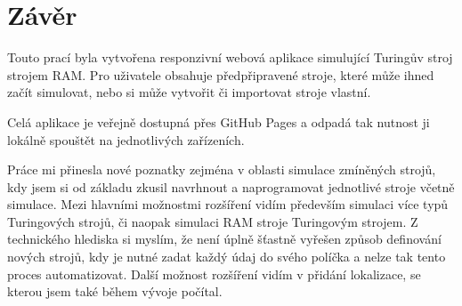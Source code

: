 \chapter{Závěr}
Touto prací byla vytvořena responzivní webová aplikace simulující Turingův stroj strojem RAM.
Pro uživatele obsahuje předpřipravené stroje, které může ihned začít simulovat, nebo si může vytvořit či importovat stroje vlastní.

Celá aplikace je veřejně dostupná přes GitHub Pages a odpadá tak nutnost ji lokálně spouštět na jednotlivých zařízeních.

Práce mi přinesla nové poznatky zejména v oblasti simulace zmíněných strojů, 
kdy jsem si od základu zkusil navrhnout a naprogramovat jednotlivé stroje včetně simulace.
Mezi hlavními možnostmi rozšíření vidím především simulaci více typů Turingových strojů, 
či naopak simulaci RAM stroje Turingovým strojem. 
Z technického hlediska si myslím, že není úplně šťastně vyřešen způsob definování nových strojů, 
kdy je nutné zadat každý údaj do svého políčka a nelze tak tento proces automatizovat.
Další možnost rozšíření vidím v přidání lokalizace, se kterou jsem také během vývoje počítal.
\endinput